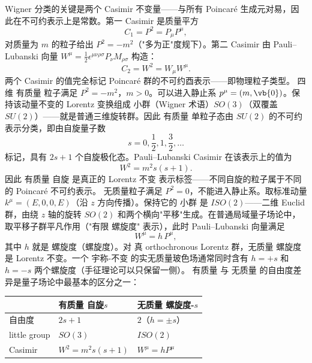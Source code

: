 Wigner 分类的关键是两个 Casimir 不变量——与所有 Poincaré 生成元对易，因此在不可约表示上是常数。第一 Casimir 是质量平方
\begin{equation}
C_1=P^2=P_\mu P^\mu,
\end{equation}
对质量为 $m$ 的粒子给出 $P^2=-m^2$（"多为正"度规下）。第二 Casimir 由 Pauli--Lubanski 向量 $W^\mu=\frac{1}{2}\epsilon^{\mu\nu\rho\sigma}P_\nu M_{\rho\sigma}$ 构造：
\begin{equation}
C_2=W^2=W_\mu W^\mu.
\end{equation}
两个 Casimir 的值完全标记 Poincaré 群的不可约酉表示——即物理粒子类型。
四维 有质量 粒子满足 $P^2=-m^2$，$m>0$。可以进入静止系 $p^\mu=(m,\vb{0})$。保持该动量不变的 Lorentz 变换组成 小群（Wigner 术语）$SO(3)$（双覆盖 $SU(2)$）——就是普通三维旋转群。因此 有质量 单粒子态由 $SU(2)$ 的不可约表示分类，即由自旋量子数
\begin{equation}
s=0,\frac{1}{2},1,\frac{3}{2},\ldots
\end{equation}
标记，具有 $2s+1$ 个自旋极化态。Pauli--Lubanski Casimir 在该表示上的值为
\begin{equation*}{W^2=m^2 s(s+1).}
\end{equation*}
因此 有质量 自旋 是真正的 Lorentz 不变 表示标签——不同自旋的粒子属于不同的 Poincaré 不可约表示。
无质量粒子满足 $P^2=0$，不能进入静止系。取标准动量 $k^\mu=(E,0,0,E)$（沿 $z$ 方向传播）。保持它的 小群 是 $ISO(2)$——二维 Euclid 群，由绕 $z$ 轴的旋转 $SO(2)$ 和两个横向"平移"生成。在普通局域量子场论中，取平移子群平凡作用（"有限 螺旋度" 表示），此时 Pauli--Lubanski 向量满足
\begin{equation*}{W^\mu=h\,P^\mu,}
\end{equation*}
其中 $h$ 就是 螺旋度（螺旋度）。对 真 orthochronous Lorentz 群，无质量 螺旋度 是 Lorentz 不变。一个 宇称-不变 的实无质量玻色场通常同时含有 $h=+s$ 和 $h=-s$ 两个螺旋度（手征理论可以只保留一侧）。
有质量 与 无质量 的自由度差异是量子场论中最基本的区分之一：

\begin{center}
\begin{tabular}{lll}
\hline
 & 有质量 自旋$s$ & 无质量 螺旋度-$s$ \\
\hline
自由度 & $2s+1$ & $2$（$h=\pm s$） \\
little group & $SO(3)$ & $ISO(2)$ \\
Casimir & $W^2=m^2s(s+1)$ & $W^\mu=hP^\mu$ \\
\hline
\end{tabular}
\end{center}

